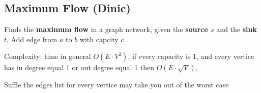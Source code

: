 \subsection{Maximum Flow (Dinic)}

Finds the \textbf{maximum flow} in a graph network, given the \textbf{source $s$} and the \textbf{sink $t$}. Add edge from $a$ to $b$ with capcity $c$.

Complexity: time in general $O(E \cdot V^2)$, if every capacity is 1, and every vertice has in degree equal 1 or out degree equal 1 then $O(E \cdot \sqrt{V})$,

Suffle the edges list for every vertice may take you out of the worst case
